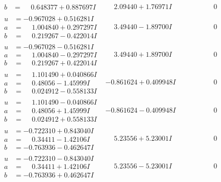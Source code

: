 \documentclass[1p]{elsarticle_modified}
\theoremstyle{definition}
\begin{document}
$$\begin{array}{c|c|c}
\begin{aligned}
b &= \phantom{-}0.648377 + 0.887697 I\end{aligned}
 & \phantom{-}2.09440 + 1.76971 I & \phantom{-0.000000 } 0 \\ \hline\begin{aligned}
u &= -0.967028 + 0.516281 I \\
a &= \phantom{-}1.004840 + 0.297297 I \\
b &= \phantom{-}0.219267 - 0.422014 I\end{aligned}
 & \phantom{-}3.49440 - 1.89700 I & \phantom{-0.000000 } 0 \\ \hline\begin{aligned}
u &= -0.967028 - 0.516281 I \\
a &= \phantom{-}1.004840 - 0.297297 I \\
b &= \phantom{-}0.219267 + 0.422014 I\end{aligned}
 & \phantom{-}3.49440 + 1.89700 I & \phantom{-0.000000 } 0 \\ \hline\begin{aligned}
u &= \phantom{-}1.101490 + 0.040866 I \\
a &= \phantom{-}0.48056 - 1.45999 I \\
b &= \phantom{-}0.024912 - 0.558133 I\end{aligned}
 & -0.861624 + 0.409948 I & \phantom{-0.000000 } 0 \\ \hline\begin{aligned}
u &= \phantom{-}1.101490 - 0.040866 I \\
a &= \phantom{-}0.48056 + 1.45999 I \\
b &= \phantom{-}0.024912 + 0.558133 I\end{aligned}
 & -0.861624 - 0.409948 I & \phantom{-0.000000 } 0 \\ \hline\begin{aligned}
u &= -0.722310 + 0.843040 I \\
a &= \phantom{-}0.34411 - 1.42106 I \\
b &= -0.763936 - 0.462647 I\end{aligned}
 & \phantom{-}5.23556 + 5.23001 I & \phantom{-0.000000 } 0 \\ \hline\begin{aligned}
u &= -0.722310 - 0.843040 I \\
a &= \phantom{-}0.34411 + 1.42106 I \\
b &= -0.763936 + 0.462647 I\end{aligned}
 & \phantom{-}5.23556 - 5.23001 I & \phantom{-0.000000 } 0 \\ \hline\begin{aligned}

\end{aligned}
\end{array}$$
\end{document}
